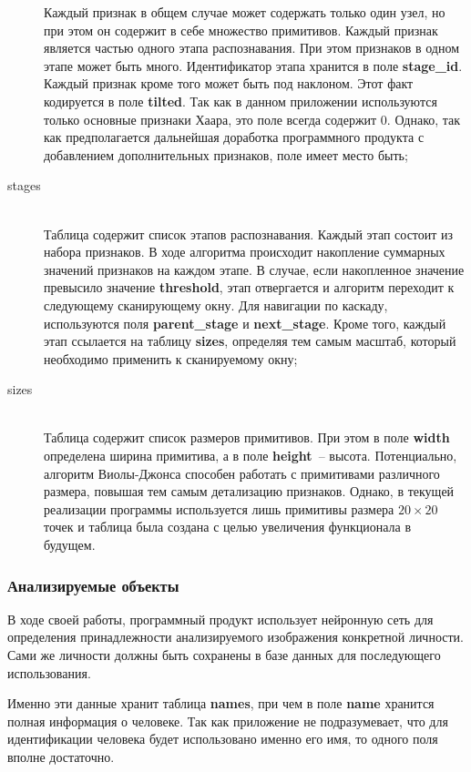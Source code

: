 \begin{description}
        Каждый признак в общем случае может содержать только один узел, но при этом он содержит в себе
        множество примитивов. Каждый признак является частью одного этапа распознавания. При этом признаков в одном этапе
        может быть много. Идентификатор этапа хранится в поле \textbf{stage\_id}. Каждый признак кроме того может быть под
        наклоном. Этот факт кодируется в поле \textbf{tilted}. Так как в данном приложении используются только основные признаки
        Хаара, это поле всегда содержит 0. Однако, так как предполагается дальнейшая доработка программного продукта с
        добавлением дополнительных признаков, поле имеет место быть;
    \item[stages] \hfill \\
        Таблица содержит список этапов распознавания. Каждый этап состоит из набора признаков.
        В ходе алгоритма происходит накопление суммарных значений признаков на каждом этапе.
        В случае, если накопленное значение превысило значение \textbf{threshold}, этап отвергается и алгоритм
        переходит к следующему сканирующему окну. Для навигации по каскаду, используются поля
        \textbf{parent\_stage} и \textbf{next\_stage}. Кроме того, каждый этап ссылается на таблицу \textbf{sizes},
        определяя тем самым масштаб, который необходимо применить к сканируемому окну;
    \item[sizes] \hfill \\
        Таблица содержит список размеров примитивов. При этом в поле \textbf{width} определена ширина примитива, а в
        поле \textbf{height}~-- высота. Потенциально, алгоритм Виолы-Джонса способен работать с примитивами различного размера,
        повышая тем самым детализацию признаков. Однако, в текущей реализации программы используется лишь примитивы размера
        $20\times20$ точек и таблица была создана с целью увеличения функционала в будущем.
\end{description}

\subsubsection{Анализируемые объекты}

В ходе своей работы, программный продукт использует нейронную сеть для определения принадлежности анализируемого
изображения конкретной личности. Сами же личности должны быть сохранены в базе данных для последующего использования.

Именно эти данные хранит таблица \textbf{names}, при чем в поле \textbf{name} хранится полная информация о человеке.
Так как приложение не подразумевает, что для идентификации человека будет использовано именно его имя, то одного поля вполне
достаточно.

